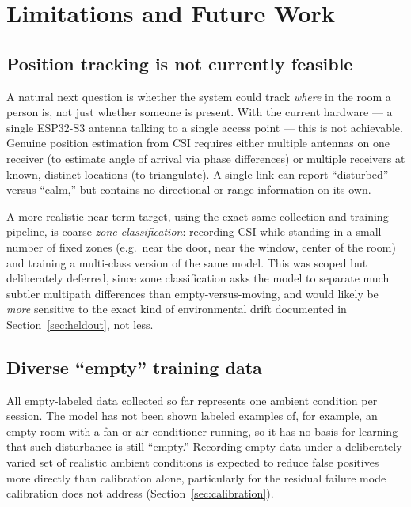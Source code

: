 \documentclass[11pt,a4paper]{article}
\begin{document}
\section{Limitations and Future Work}
\label{sec:future-work}

\subsection{Position tracking is not currently feasible}

A natural next question is whether the system could track \emph{where}
in the room a person is, not just whether someone is present. With the
current hardware --- a single ESP32-S3 antenna talking to a single
access point --- this is not achievable. Genuine position estimation
from CSI requires either multiple antennas on one receiver (to estimate
angle of arrival via phase differences) or multiple receivers at known,
distinct locations (to triangulate). A single link can report
``disturbed'' versus ``calm,'' but contains no directional or
range information on its own.

A more realistic near-term target, using the exact same collection and
training pipeline, is coarse \emph{zone classification}: recording CSI
while standing in a small number of fixed zones (e.g.\ near the door,
near the window, center of the room) and training a multi-class version
of the same model. This was scoped but deliberately deferred, since
zone classification asks the model to separate much subtler multipath
differences than empty-versus-moving, and would likely be \emph{more}
sensitive to the exact kind of environmental drift documented in
Section~\ref{sec:heldout}, not less.

\subsection{Diverse ``empty'' training data}

All empty-labeled data collected so far represents one ambient condition
per session. The model has not been shown labeled examples of, for
example, an empty room with a fan or air conditioner running, so it has
no basis for learning that such disturbance is still ``empty.''
Recording empty data under a deliberately varied set of realistic
ambient conditions is expected to reduce false positives more directly
than calibration alone, particularly for the residual failure mode
calibration does not address (Section~\ref{sec:calibration}).
\end{document}
